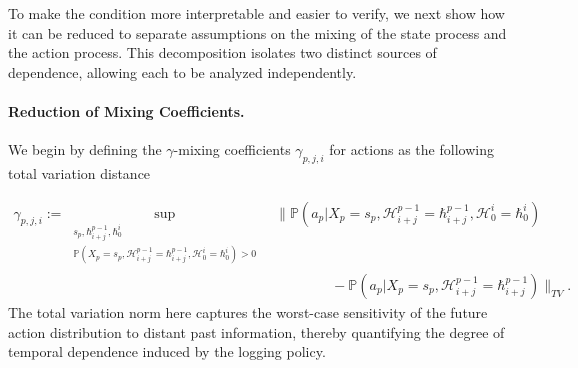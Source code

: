\documentclass[twoside,11pt]{article}
\numberwithin{equation}{section}
\newcommand{\lp}{\left(}
\newcommand{\rp}{\right)}
\newcommand{\History}{\mathcal{H}}
\newcommand{\history}{\hbar}
\newcommand{\Pbb}{\mathbb{P}}
\newcommand\numberthis{\addtocounter{equation}{1}\tag{\theequation}}
\newcommand{\prob}{\Pbb}
\newcommand{\probl}{\prob}
\begin{document}
To make the condition more interpretable and easier to verify, we next show how it can be reduced to separate assumptions on the mixing of the state process and the action process. 
This decomposition isolates two distinct sources of dependence, allowing each to be analyzed independently.

\paragraph{Reduction of Mixing Coefficients.} 

We begin by defining the $\gamma$-mixing coefficients  $\gamma_{p,j,i}$ for actions as the following total variation distance 

  \begin{align*}
    \gamma_{p,j,i} := 
    \sup_{\substack{s_p, \history_{i+j}^{p-1}, \history_0^i\\\prob\lp X_p=s_p,\History_{i+j}^{p-1}=\history_{i+j}^{p-1},\History_0^i=\history_{0}^{i}\rp>0}} 
    & \Big\lVert 
        \probl\lp 
            a_p \Big| X_p = s_p, \History_{i+j}^{p-1} = \history_{i+j}^{p-1}, \History_0^i = \history_{0}^i
        \rp \\&\qquad \qquad -  \probl\lp  
            a_p \Big| X_p = s_p, \History_{i+j}^{p-1} = \history_{i+j}^{p-1}
        \rp
    \Big\rVert_{TV}.
\end{align*}    
The total variation norm here captures the worst-case sensitivity of the future action distribution to distant past information, thereby quantifying the degree of temporal dependence induced by the logging policy.
\end{document}
